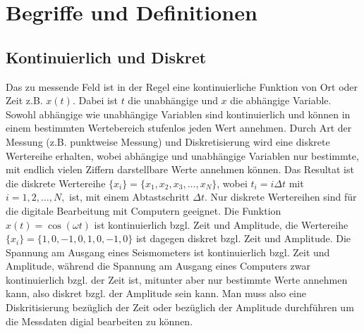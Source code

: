 \chapter{Begriffe und Definitionen}
\section{Kontinuierlich und Diskret}
Das zu messende Feld ist in der Regel eine kontinuierliche Funktion von Ort oder Zeit z.B. $x(t)$. Dabei ist $t$ die unabhängige und $x$ die abhängige Variable. Sowohl abhängige wie unabhängige Variablen sind kontinuierlich und können in einem bestimmten Wertebereich stufenlos jeden Wert annehmen. Durch Art der Messung (z.B. punktweise Messung) und Diskretisierung wird eine diskrete Wertereihe erhalten, wobei abhängige und unabhängige Variablen nur bestimmte, mit endlich vielen Ziffern darstellbare Werte annehmen können. Das Resultat ist die diskrete Wertereihe  $\{x_{i}\}=\{x_{1}, x_{2}, x_{3}, \dots, x_N\}$, wobei $t_{i}=i\Delta t$ mit $i=1,2, \dots, N,$ ist, mit einem Abtastschritt $\Delta t$. Nur diskrete Wertereihen sind für die digitale Bearbeitung mit Computern geeignet.  Die Funktion $x(t)=\cos(\omega t)$ ist kontinuierlich bzgl. Zeit und Amplitude, die Wertereihe $\{ x_i \}= \{1,0,-1,0,1,0,-1,0\}$ ist dagegen diskret bzgl. Zeit und Amplitude. Die Spannung am Ausgang eines Seismometers ist kontinuierlich bzgl. Zeit und Amplitude, während die Spannung am Ausgang eines Computers zwar kontinuierlich bzgl. der Zeit ist, mitunter aber nur bestimmte Werte annehmen kann, also diskret bzgl. der Amplitude sein kann. Man muss also eine Diskritisierung bezüglich der Zeit oder bezüglich der Amplitude durchführen um die Messdaten digial bearbeiten zu können.\\

